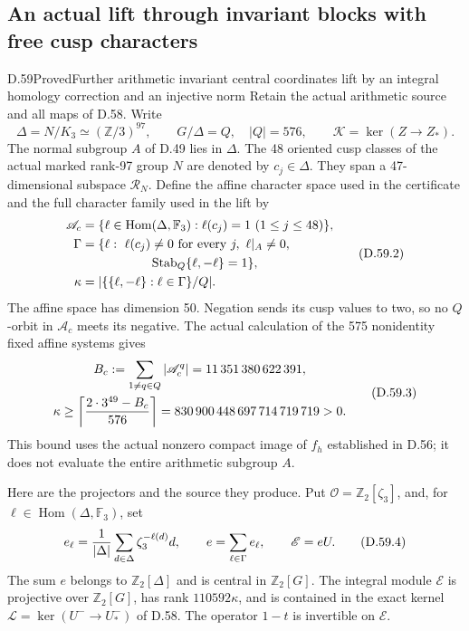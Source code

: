 \subsection{An actual lift through invariant blocks with free cusp characters}

\begin{statement}{D.59}{Proved}{Further arithmetic invariant central coordinates lift by an integral homology correction and an injective norm}
Retain the actual arithmetic source and all maps of D.58.
Write
\[
 \Delta=N/K_3\simeq(\mathbb Z/3)^{97},\qquad
 G/\Delta=Q,\quad |Q|=576,\qquad
 \mathcal K=\ker(Z\longrightarrow Z_*).
 \tag{D.59.1}
\]
The normal subgroup \(A\) of D.49 lies in \(\Delta\).
The 48 oriented cusp classes of the actual marked
rank-97 group \(N\) are denoted by \(c_j\in\Delta\).
They span a 47-dimensional subspace \(\mathcal R_N\).
Define the affine character space used in the certificate
and the full character family used in the lift by
\[
 \begin{aligned}
 \mathscr A_c&=\{\ell\in\operatorname{Hom}(\Delta,\mathbb F_3):
                          \ell(c_j)=1\ (1\leq j\leq48)\},\\
 \Gamma&=\{\ell:\ \ell(c_j)\ne0\text{ for every }j,
          \ \ell|_A\ne0,\\
          &\hspace{19mm}\operatorname{Stab}_Q\{\ell,-\ell\}=1\},\\
 \kappa&=|\{\{\ell,-\ell\}:\ell\in\Gamma\}/Q|.
 \end{aligned}
 \tag{D.59.2}
\]
The affine space has dimension 50. Negation sends
its cusp values to two, so no \(Q\)-orbit in
\(\mathscr A_c\) meets its negative. The actual
calculation of the 575 nonidentity fixed affine
systems gives
\[
 \begin{gathered}
 B_c:=\sum_{1\ne q\in Q}|\mathscr A_c^q|
                  =11\,351\,380\,622\,391,\\
 \kappa\geq
 \left\lceil{2\cdot3^{49}-B_c\over576}\right\rceil
          =830\,900\,448\,697\,714\,719\,719>0.
 \end{gathered}
 \tag{D.59.3}
\]
This bound uses the actual nonzero compact image
of \(f_h\) established in D.56; it does not
evaluate the entire arithmetic subgroup \(A\).

Here are the projectors and the source they produce.
Put \(\mathcal O=\mathbb Z_2[\zeta_3]\), and, for
\(\ell\in\operatorname{Hom}(\Delta,\mathbb F_3)\), set
\[
 e_\ell={1\over|\Delta|}
             \sum_{d\in\Delta}\zeta_3^{-\ell(d)}d,
 \qquad e=\sum_{\ell\in\Gamma}e_\ell,
 \qquad \mathscr E=eU.
 \tag{D.59.4}
\]
The sum \(e\) belongs to \(\mathbb Z_2[\Delta]\)
and is central in \(\mathbb Z_2[G]\).
The integral module \(\mathscr E\) is projective
over \(\mathbb Z_2[G]\), has rank
\(110592\kappa\), and is contained in the exact
kernel \(\mathcal L=\ker(U^-\to U_*^-)\) of D.58.
The operator \(1-t\) is invertible on \(\mathscr E\).


\end{statement}
